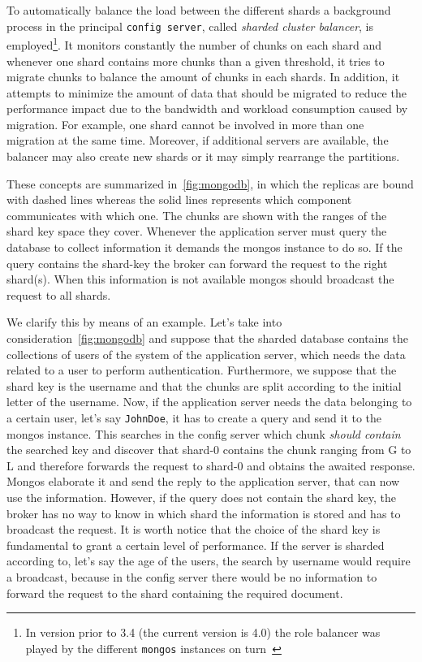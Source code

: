 To automatically balance the load between the different shards a background
process in the principal \texttt{config server}, called \emph{sharded cluster
balancer},
is employed\footnote{In version prior to 3.4 (the current version is 4.0) the
role balancer was played by the different \texttt{mongos}
instances on turn~\cite{bib:mongodb-docs}}. It monitors constantly the number
of chunks on each shard and  whenever one  shard contains more chunks than a
given threshold, it tries to migrate chunks to balance the amount of chunks
in each shards. In addition, it attempts to minimize the amount of data
that should be migrated to reduce the performance impact due to the bandwidth
and workload consumption caused by migration. For example, one shard cannot be
involved in more than one migration at the same time. Moreover, if additional
servers are available, the balancer may also create new shards or it may simply
rearrange the partitions.

These concepts are summarized in~\autoref{fig:mongodb}, in which the replicas
are bound with dashed lines whereas the solid lines represents which
component communicates with which one. The chunks are shown with the
ranges of the shard key space they cover.
Whenever the application server must query the database to collect information
it demands the mongos instance to do so. If the query contains the shard-key
the broker can forward the request to the right shard(s). When this information
is not available mongos should broadcast the request to all shards.

We clarify this by means of an example. Let's take into
consideration~\autoref{fig:mongodb} and suppose that the sharded database
contains the collections of users of the system of the application server,
which needs the data related to a user to perform authentication.
Furthermore, we suppose that the shard key is the username and that the chunks
are split according to the initial letter of the username. Now, if the
application server needs the data belonging to a certain user, let's say
\texttt{JohnDoe}, it has to create a query and send it to the mongos instance.
This searches in the config server which chunk \emph{should contain} the
searched key and discover that shard-0 contains the chunk ranging from G to L
and therefore forwards the request to shard-0 and obtains the awaited response.
Mongos elaborate it and send the reply to the application server, that can now
use the information. However, if the query does not contain the shard key, the
broker has no way to know in which shard the information is stored and has to
broadcast the request.
It is worth notice that the choice of the shard key is fundamental to grant a
certain level of performance. If the server is sharded according to, let's say
the age of the users, the search by username would require a broadcast, because
in the config server there would be no information to forward the request to
the shard containing the required document.


